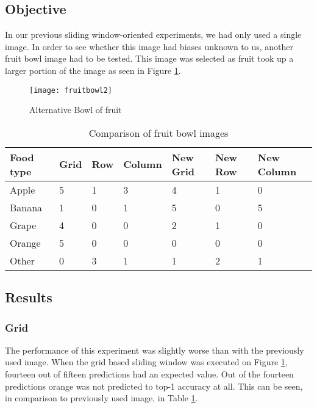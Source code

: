 \tocless\subsection{Objective}
In our previous sliding window-oriented experiments, we had only used a
single image. In order to see whether this image had biases unknown
to us, another fruit bowl image had to be tested. This image was selected as
fruit took up a larger portion of the image as seen in Figure \ref{fig:newFruit}.

\begin{figure}
\centering
    \texttt{[image: fruitbowl2]}
    \caption{Alternative Bowl of fruit}
    \label{fig:newFruit}
\end{figure}

\begin{table}[]
    \centering
    \caption{Comparison of fruit bowl images}
    \label{newFruitTable}
    \begin{tabular}{|l|l|l|l|p{1.25cm}|p{1.25cm}|p{2cm}|}
    \hline
        \textbf{Food type} & \textbf{Grid} & \textbf{Row} & \textbf{Column} & \textbf{New Grid} & \textbf{New Row} & \textbf{New Column} \\ \hline
        Apple     & 5    & 1   & 3      & 4        & 1       & 0          \\ \hline
        Banana    & 1    & 0   & 1      & 5        & 0       & 5          \\ \hline
        Grape     & 4    & 0   & 0      & 2        & 1       & 0          \\ \hline
        Orange    & 5    & 0   & 0      & 0        & 0       & 0          \\ \hline
        Other     & 0    & 3   & 1      & 1        & 2       & 1         \\ \hline
    \end{tabular}
\end{table}

\tocless\subsection{Results}
\tocless\subsubsection{Grid}
The performance of this experiment was slightly worse than with the previously
used image. When the grid based sliding window was executed on Figure
\ref{fig:newFruit}, fourteen out of fifteen predictions had an expected value.
Out of the fourteen predictions orange was not predicted to top-1 accuracy at
all. This can be seen, in comparison to previously used image, in Table
\ref{newFruitTable}.

